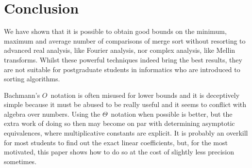 \section{Conclusion}

We have shown that it is possible to obtain good bounds on the
minimum, maximum and average number of comparisons of merge sort
without resorting to advanced real analysis, like Fourier analysis,
nor complex analysis, like Mellin transforms. Whilst these powerful
techniques indeed bring the best results, they are not suitable for
postgraduate students in informatics who are introduced to sorting
algorithms.

Bachmann's \(O\)~notation is often misused for lower bounds and it is
deceptively simple because it must be abused to be really useful and
it seems to conflict with algebra over numbers. Using the
\(\Theta\)~notation when possible is better, but the extra work of
doing so then may become on par with determining asymptotic
equivalences, where multiplicative constants are explicit. It is
probably an overkill for most students to find out the exact linear
coefficients, but, for the most motivated, this paper shows how to do
so at the cost of slightly less precision sometimes.
